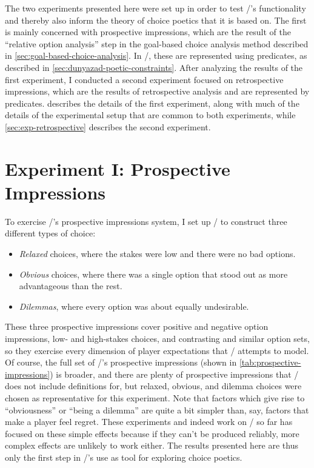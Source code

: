 The two experiments presented here were set up in order to test \dunyazad/'s functionality and thereby also inform the theory of choice poetics that it is based on.
%
The first is mainly concerned with prospective impressions, which are the result of the ``relative option analysis'' step in the goal-based choice analysis method described in \cref{sec:goal-based-choice-analysis}.
%
In \dunyazad/, these are represented using  predicates, as described in \cref{sec:dunyazad-poetic-constraints}.
%
After analyzing the results of the first experiment, I conducted a second experiment focused on retrospective impressions, which are the results of retrospective analysis and are represented by  predicates.
%
 describes the details of the first experiment, along with much of the details of the experimental setup that are common to both experiments, while \cref{sec:exp-retrospective} describes the second experiment.


\section{Experiment I: Prospective Impressions}

\label{sec:exp-prospective}

To exercise \dunyazad/'s prospective impressions system, I set up \dunyazad/ to construct three different types of choice:
%
\begin{itemize}
  \item \emph{Relaxed} choices, where the stakes were low and there were no bad options.
  \item \emph{Obvious} choices, where there was a single option that stood out as more advantageous than the rest.
  \item \emph{Dilemmas}, where every option was about equally undesirable.
\end{itemize}
%
These three prospective impressions cover positive and negative option impressions, low- and high-stakes choices, and contrasting and similar option sets, so they exercise every dimension of player expectations that \dunyazad/ attempts to model.
%
Of course, the full set of \dunyazad/'s prospective impressions (shown in \cref{tab:prospective-impressions}) is broader, and there are plenty of prospective impressions that \dunyazad/ does not include definitions for, but relaxed, obvious, and dilemma choices were chosen as representative for this experiment.
%
Note that factors which give rise to ``obviousness'' or ``being a dilemma'' are quite a bit simpler than, say, factors that make a player feel regret.
%
These experiments and indeed work on \dunyazad/ so far has focused on these simple effects because if they can't be produced reliably, more complex effects are unlikely to work either.
%
The results presented here are thus only the first step in \dunyazad/'s use as tool for exploring choice poetics.


